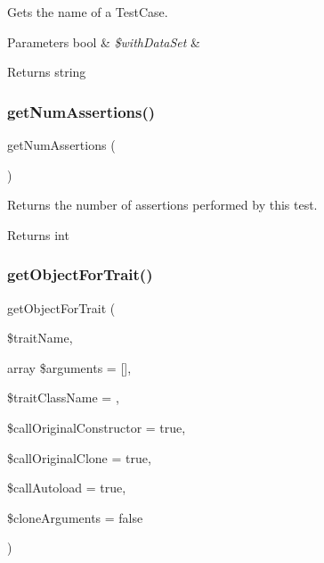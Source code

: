 Gets the name of a Test\+Case.


\begin{DoxyParams}[1]{Parameters}
bool & {\em \$with\+Data\+Set} & \\
\hline
\end{DoxyParams}
\begin{DoxyReturn}{Returns}
string 
\end{DoxyReturn}
\mbox{\label{class_p_h_p_unit___framework___test_case_af1e160d4fe1e78ac3e58f018b530911c}} 
\subsubsection{\texorpdfstring{get\+Num\+Assertions()}{getNumAssertions()}}
{\footnotesize\ttfamily get\+Num\+Assertions (\begin{DoxyParamCaption}{ }\end{DoxyParamCaption})}

Returns the number of assertions performed by this test.

\begin{DoxyReturn}{Returns}
int 
\end{DoxyReturn}
\mbox{\label{class_p_h_p_unit___framework___test_case_aa2d60c8f9532c9b08124447f734caeea}} 
\subsubsection{\texorpdfstring{get\+Object\+For\+Trait()}{getObjectForTrait()}}
{\footnotesize\ttfamily get\+Object\+For\+Trait (\begin{DoxyParamCaption}\item[{}]{\$trait\+Name,  }\item[{array}]{\$arguments = {\ttfamily \mbox{[}\mbox{]}},  }\item[{}]{\$trait\+Class\+Name = {\ttfamily \textquotesingle{}\textquotesingle{}},  }\item[{}]{\$call\+Original\+Constructor = {\ttfamily true},  }\item[{}]{\$call\+Original\+Clone = {\ttfamily true},  }\item[{}]{\$call\+Autoload = {\ttfamily true},  }\item[{}]{\$clone\+Arguments = {\ttfamily false} }\end{DoxyParamCaption})\hspace{0.3cm}{\ttfamily [protected]}}

